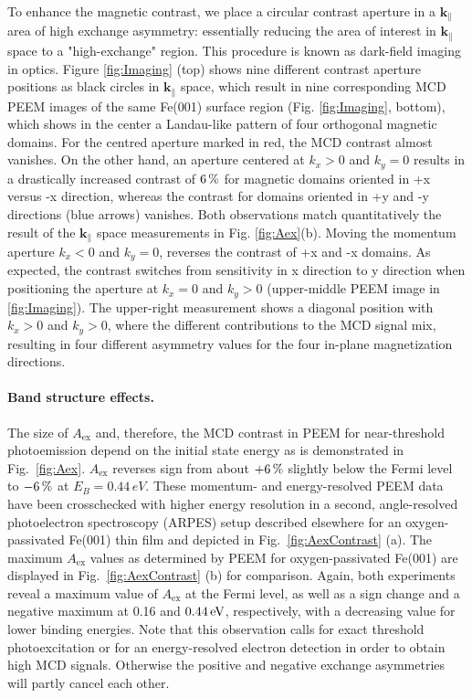 \documentclass[prl,twocolumn,floatfix]{revtex4-2}
\renewcommand{\vec}[1]{\boldsymbol{#1}}
\begin{document}
To enhance the magnetic contrast, we place a circular contrast aperture in a $\vec{k}_{\parallel}$ area of high exchange asymmetry: essentially reducing the area of interest in $\vec{k}_{\parallel}$ space to a "high-exchange" region. This procedure is known as dark-field imaging in optics. 
Figure \ref{fig:Imaging} (top) shows nine different contrast aperture positions as black circles in $\vec{k}_{\parallel}$ space, which result in nine corresponding MCD PEEM images of the same Fe(001) surface region (Fig. \ref{fig:Imaging}, bottom), which shows in the center a Landau-like pattern of four orthogonal magnetic domains. For the centred aperture marked in red, the MCD contrast almost vanishes. On the other hand, an aperture centered at $k_x > 0$ and $k_y=0$ results in a drastically increased contrast of $\unit[6]{\%}$ for magnetic domains oriented in +x versus -x direction, whereas the contrast for domains oriented in +y and -y directions (blue arrows) vanishes. Both observations match quantitatively the result of the $\vec{k}_{\parallel}$ space measurements in Fig. \ref{fig:Aex}(b). Moving the momentum aperture $k_x < 0$ and $k_y=0$, reverses the contrast of +x and -x domains. 
As expected, the contrast switches from sensitivity in x direction to y direction when positioning the aperture at $k_x = 0$ and $k_y > 0$ (upper-middle PEEM image in \ref{fig:Imaging}). The upper-right measurement shows a diagonal position with $k_x > 0$ and $k_y > 0$, where the different contributions to the MCD signal mix, resulting in four different asymmetry values for the four in-plane magnetization directions. 

\paragraph{Band structure effects.}
The size of $A_{\mathrm{ex}}$ and, therefore, the MCD contrast in PEEM for near-threshold photoemission depend on the initial state energy as is demonstrated in Fig.~\ref{fig:Aex}. $A_{\mathrm{ex}}$ reverses sign from about $\unit[+6]{\%}$ slightly below the Fermi level to $\unit[-6]{\%}$ at $E_B= 0.44\,eV$. 
These momentum- and energy-resolved PEEM data have been crosschecked with higher energy resolution in a second, angle-resolved photoelectron spectroscopy (ARPES) setup described elsewhere \cite{gillmeister2018, gillmeister2020} for an oxygen-passivated Fe(001) thin film and depicted in Fig.~\ref{fig:AexContrast} (a). The maximum $A_{\mathrm{ex}}$ values as determined by PEEM for oxygen-passivated Fe(001) are displayed in Fig.~\ref{fig:AexContrast} (b) for comparison. Again, both experiments reveal a maximum value of $A_{\mathrm{ex}}$ at the Fermi level, as well as a sign change and a negative maximum at 0.16 and $\unit[0.44]{eV}$, respectively, with a decreasing value for lower binding energies. Note that this observation calls for exact threshold photoexcitation or for an energy-resolved electron detection in order to obtain high MCD signals. Otherwise the positive and negative exchange asymmetries will partly cancel each other.
\end{document}
